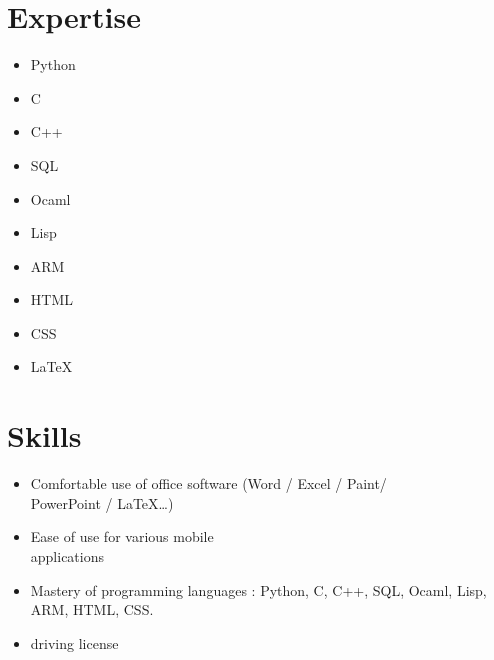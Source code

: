 \documentclass[9pt, oneside, a4paper, titlepage]{extarticle}
\begin{document}
\begin{tcolorbox}
\begin{minipage}[t]{6.2cm}
\begin{spacing}{0.95}
\begin{tcolorbox}[grow to left by = 0.6cm, colback = gray!25, colframe = white]
                \section*{Expertise}
                \begin{multicols}{2}
                \begin{itemize}
                    \item Python
                    \item C
                    \item C++
                    \item SQL
                    \item Ocaml
                    \columnbreak                    
                    \item Lisp
                    \item ARM
                    \item HTML
                    \item CSS
                    \item \LaTeX
                \end{itemize}
                \end{multicols}
                \vspace*{0.2cm}
                \section*{Skills}

                \begin{itemize}
                    \vspace*{0.3cm}
                    \item Comfortable use of office software (Word / Excel / Paint/ \\PowerPoint / \LaTeX \ldots)
                    \vspace*{0.2cm}
                    \item Ease of use for various mobile \\applications
                    \vspace*{0.2cm}
                    \item Mastery of programming languages : Python, C, C++, SQL, Ocaml, Lisp, ARM, HTML, CSS.
                    \vspace*{0.2cm}
                    \item driving license

                \end{itemize}



\end{tcolorbox}
\end{spacing}
\end{minipage}
\end{tcolorbox}
\end{document}
